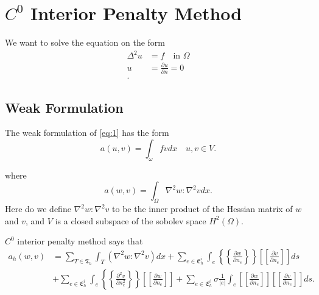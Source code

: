 \section{$C^0$ Interior Penalty Method}\label{sec:ch1}


We want to solve the equation on the form
\begin{align}
    \label{eq:1}
    \Delta ^{2} u &= f \quad \text{in } \Omega  \\
    u &= \frac{\partial u}{\partial n} = 0  \\
.\end{align}

\subsection{Weak Formulation}%
\label{sub:weak_formulation}


The weak formulation of \eqref{eq:1} has the form
\begin{equation}
\label{eq:2}
    a\left( u,v \right) = \int_{\omega}^{} f v dx \quad u,v \in V
.\end{equation}

where
\begin{equation}
\label{eq:3}
    a\left( w,v \right) = \int_{\Omega }^{} \nabla ^2 w : \nabla ^2 v dx
.\end{equation}
Here do we define $\nabla ^2 w : \nabla ^2 v $ to be the inner product of the Hessian matrix of $w$  and $v$, and $V$
is a closed subspace of the sobolev space $H^2\left( \Omega  \right)$.

$C^{0}$ interior penalty method says that
\begin{align*}
    a_{h} \left( w,v \right) &= \sum_{T \in \mathfrak{T}_h      }^{ } \int_{T}^{} \left( \nabla ^2 w : \nabla ^2 v
    \right) dx  + \sum_{e \in \mathfrak{E}_{h}^{i} }^{} \int_{e}^{} \left\{\!\!\!\left\{ \frac{\partial w}{\partial n_{e}} \right\}\!\!\!\right\}
   \left[\!\!\left[ \frac{\partial v}{\partial n_{e}} \right]\!\!\right] ds  \\
   & +  \sum_{e \in \mathfrak{E} _{h}^{i}}^{}
   \int_{e}^{} \left\{\!\!\!\left\{ \frac{\partial ^2 v}{\partial n_e^{2} } \right\}\!\!\!\right\} \left[\!\!\left[
   \frac{\partial w }{\partial n_{e}} \right]\!\!\right] + \sum_{e \in \mathfrak{E} _{h}^{i}}^{} \sigma \frac{1}{\left\lvert
e \right\rvert }  \int_{e}^{} \left[\!\!\left[ \frac{\partial w}{\partial n_{e}} \right]\!\!\right] \left[\!\!\left[
\frac{\partial v }{\partial n_{e}} \right]\!\!\right]     ds
.\end{align*}


